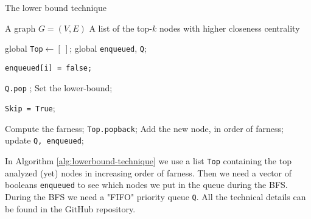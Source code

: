\begin{algorithm}
    \caption{The lower bound technique}\label{alg:lowerbound-technique}
    \begin{algorithmic}

    \Require A graph $G = (V,E)$
    \Ensure A list of the top-$k$ nodes with higher closeness centrality

    \State global \texttt{Top}$\gets [~]$;
    \State global \texttt{enqueued}, \texttt{Q};

          \State \texttt{enqueued[i] = false;}
    \EndFor


        \State \texttt{Q.pop} ;
        \State Set the lower-bound;

            \State \texttt{Skip = True}; 

        \Else
            \State Compute the farness; 
            \State \texttt{Top.pop\textunderscore back}; 
            \State Add the new node, in order of farness;
            \State update \texttt{Q, enqueued};
        \EndIf

    \EndWhile




\end{algorithmic}
\end{algorithm}



\nd In Algorithm \ref*{alg:lowerbound-technique} we use a list \texttt{Top} containing the top analyzed (yet) nodes in increasing order of farness. Then we need a vector of booleans \texttt{enqueued} to see which nodes we put in the queue during the BFS. During the BFS we need a "FIFO" priority queue \texttt{Q}. All the technical details can be found in the GitHub repository.
